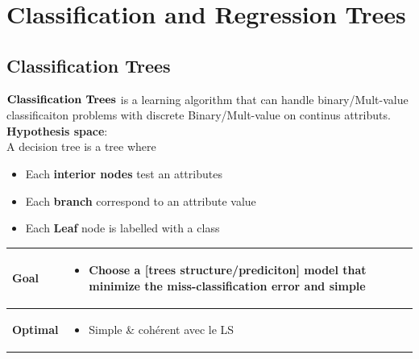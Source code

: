 \section{Classification and Regression Trees}
\subsection{Classification Trees}
$\textbf{Classification Trees}$ is a learning algorithm that can handle binary/Mult-value classificaiton problems with discrete Binary/Mult-value on continus attributs.\\
\textbf{Hypothesis space}:\\
A decision tree is a tree where
\begin{itemize}
    \item Each \textbf{interior nodes} test an attributes
    \item Each \textbf{branch} correspond to an attribute value
    \item Each \textbf{Leaf} node is labelled with a class
\end{itemize}

  \begin{table}[!h]
    \begin{center}
    \begin{tabular}{| m{8em}| m{30em}|}
    \hline
    \centering
    \rowcolor{blue.g} \textbf{Goal}     &  \begin{itemize}
                                              \item Choose a [trees structure/prediciton] model that \textbf{minimize} the \textbf{miss-classification} error  and \textbf{simple}  
                                          \end{itemize}\\ \hline
                                          
    \centering
    \rowcolor{vert.g} \textbf{Optimal}     &  \begin{itemize}
                                              \item Simple \& cohérent avec le LS
                                          \end{itemize}\\ \hline
                                                                                
    \end{tabular}
    \end{center}
    \end{table}

